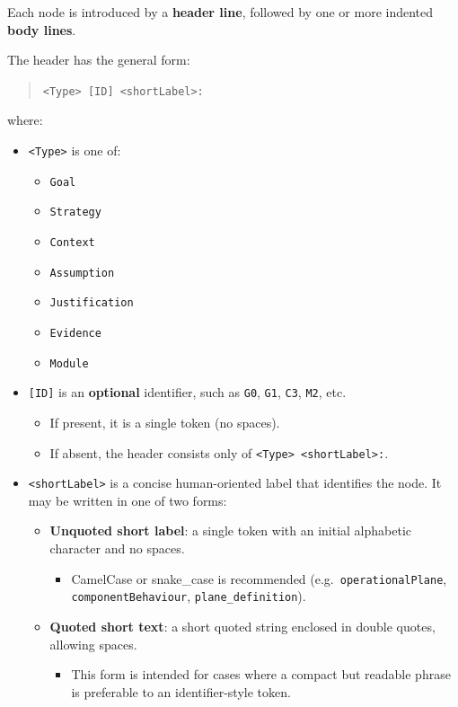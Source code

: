 \documentclass[11pt]{article}
\begin{document}
Each node is introduced by a \textbf{header line}, followed by one or more indented \textbf{body lines}.

The header has the general form:
\begin{quote}
\texttt{\textless Type\textgreater{} [ID] \textless shortLabel\textgreater:}
\end{quote}

where:

\begin{itemize}[leftmargin=2em]
  \item \texttt{\textless Type\textgreater{}} is one of:
  \begin{itemize}[leftmargin=1.5em]
    \item \texttt{Goal}
    \item \texttt{Strategy}
    \item \texttt{Context}
    \item \texttt{Assumption}
    \item \texttt{Justification}
    \item \texttt{Evidence}
    \item \texttt{Module}
  \end{itemize}

  \item \texttt{[ID]} is an \textbf{optional} identifier, such as \texttt{G0}, \texttt{G1}, \texttt{C3}, \texttt{M2}, etc.
  \begin{itemize}[leftmargin=1.5em]
    \item If present, it is a single token (no spaces).
    \item If absent, the header consists only of \texttt{\textless Type\textgreater{} \textless shortLabel\textgreater:}.
  \end{itemize}

  \item \texttt{\textless shortLabel\textgreater{}} is a concise human-oriented label that identifies the node.
  It may be written in one of two forms:
  \begin{itemize}[leftmargin=1.5em]
    \item \textbf{Unquoted short label}: a single token with an initial alphabetic character and no spaces.
    \begin{itemize}[leftmargin=1.5em]
      \item CamelCase or snake\_case is recommended (e.g.\ \texttt{operationalPlane}, \texttt{componentBehaviour}, \texttt{plane\_definition}).
    \end{itemize}
    \item \textbf{Quoted short text}: a short quoted string enclosed in double quotes, allowing spaces.
    \begin{itemize}[leftmargin=1.5em]
      \item This form is intended for cases where a compact but readable phrase is preferable to an identifier-style token.
    \end{itemize}
  \end{itemize}


\end{itemize}
\end{document}

